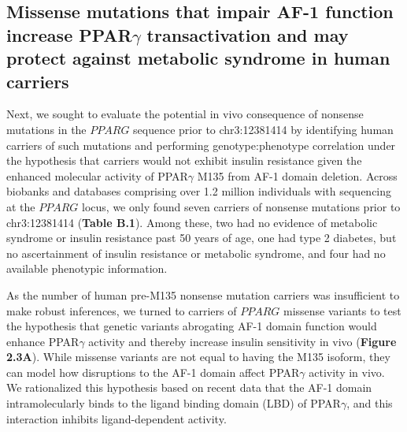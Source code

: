 \subsection{Missense mutations that impair AF-1 function increase PPAR\texorpdfstring{$\gamma$}{gamma} transactivation and may protect against metabolic syndrome in human carriers}

Next, we sought to evaluate the potential in vivo consequence of nonsense mutations in the \(PPARG\) sequence prior to chr3:12381414 by identifying human carriers of such mutations and performing genotype:phenotype correlation under the hypothesis that carriers would not exhibit insulin resistance given the enhanced molecular activity of PPAR$\gamma$ M135 from AF-1 domain deletion. Across biobanks and databases comprising over 1.2 million individuals with sequencing at the \(PPARG\) locus, we only found seven carriers of nonsense mutations prior to chr3:12381414 (\textbf{Table B.1}). Among these, two had no evidence of metabolic syndrome or insulin resistance past 50 years of age, one had type 2 diabetes, but no ascertainment of insulin resistance or metabolic syndrome, and four had no available phenotypic information.

As the number of human pre-M135 nonsense mutation carriers was insufficient to make robust inferences, we turned to carriers of \(PPARG\) missense variants to test the hypothesis that genetic variants abrogating AF-1 domain function would enhance PPAR$\gamma$ activity and thereby increase insulin sensitivity in vivo (\textbf{Figure 2.3A}). While missense variants are not equal to having the M135 isoform, they can model how disruptions to the AF-1 domain affect PPAR$\gamma$ activity in vivo. We rationalized this hypothesis based on recent data that the AF-1 domain intramolecularly binds to the ligand binding domain (LBD) of PPAR$\gamma$, and this interaction inhibits ligand-dependent activity\cite{Mosure2022-tw}. 

